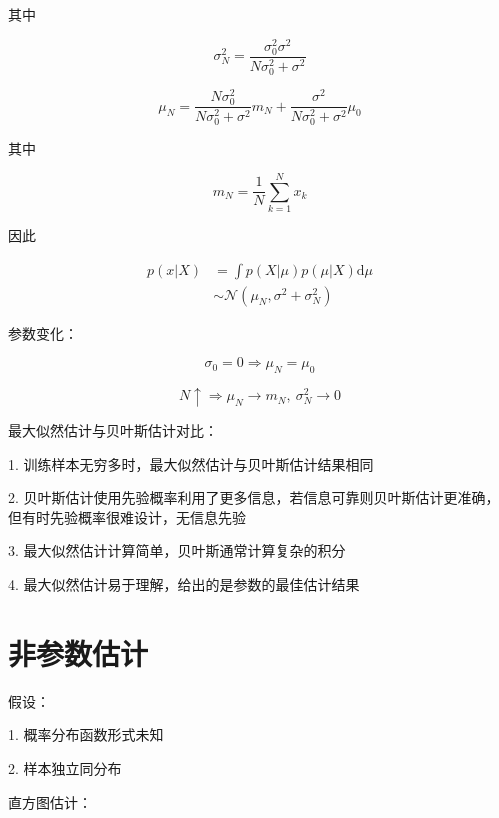 \documentclass[openany,a4paper,12pt]{ctexbook}
\theoremstyle{kaiti}
\theoremstyle{normal}
\begin{document}
其中

\begin{equation}
\sigma_{N}^{2}=\frac{\sigma_{0}^{2}\sigma^2}{N\sigma_{0}^{2}+\sigma^2}
\end{equation}

\begin{equation}
\mu_N=\frac{N\sigma_{0}^{2}}{N\sigma_{0}^{2}+\sigma^2}m_N+\frac{\sigma^2}{N\sigma_{0}^{2}+\sigma^2}\mu_0
\end{equation}

其中

\begin{equation}
m_N=\frac{1}{N}\sum_{k=1}^N{x_k}
\end{equation}

因此

\begin{equation}
\begin{aligned}
  p\left(x|X \right)
  &=\int{p(X|\mu)p(\mu|X)\mathrm{d}\mu}\\
  &\sim \mathcal{N} \left(\mu_N,\sigma^2+\sigma_{N}^{2} \right)
\end{aligned}
\end{equation}

参数变化：

\begin{equation}
\sigma_0=0\Rightarrow \mu_N=\mu_0
\end{equation}

\begin{equation}
N\uparrow \Rightarrow \mu_N\rightarrow m_N,~\sigma_{N}^{2}\rightarrow 0
\end{equation}

最大似然估计与贝叶斯估计对比：

1. 训练样本无穷多时，最大似然估计与贝叶斯估计结果相同

2. 贝叶斯估计使用先验概率利用了更多信息，若信息可靠则贝叶斯估计更准确，但有时先验概率很难设计，无信息先验

3. 最大似然估计计算简单，贝叶斯通常计算复杂的积分

4. 最大似然估计易于理解，给出的是参数的最佳估计结果

\section{非参数估计}

假设：

1. 概率分布函数形式未知

2. 样本独立同分布

直方图估计：
\end{document}
